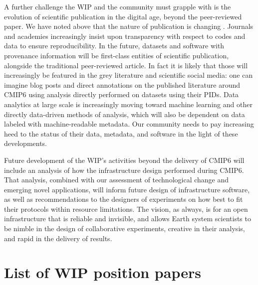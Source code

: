 \documentclass[gmd,manuscript]{copernicus}
\begin{document}
A further challenge the WIP and the community must grapple with is
the evolution of scientific publication in the digital age, beyond the
peer-reviewed paper. We have noted above that the nature of
publication is changing \citep[see e.g][]{ref:davidetal2016}. Journals
and academies increasingly insist upon transparency with respect to
codes and data to ensure reproducibility. In the future, datasets and
software with provenance information will be first-class entities of
scientific publication, alongside the traditional peer-reviewed
article. In fact it is likely that those will increasingly be featured in
the grey literature and scientific social media: one can imagine blog
posts and direct annotations on the published literature around CMIP6
using analysis directly performed on datasets using their PIDs. Data
analytics at large scale is increasingly moving toward machine
learning and other directly data-driven methods of analysis, which
will also be dependent on data labeled with machine-readable metadata.
Our community needs to pay increasing heed to the status of their
data, metadata, and software in the light of these developments.

Future development of the WIP's activities beyond the delivery of
CMIP6 will include an analysis of how the infrastructure design
performed during CMIP6. That analysis, combined with our assessment of
technological change and emerging novel applications, will inform
future design of infrastructure software, as well as recommendations
to the designers of experiments on how best to fit their protocols
within resource limitations. The vision, as always, is for an open
infrastructure that is reliable and invisible, and allows Earth system
scientists to be nimble in the design of collaborative experiments,
creative in their analysis, and rapid in the delivery of results.

\appendix

\section{List of WIP position papers}
\label{sec:wip}
\end{document}
